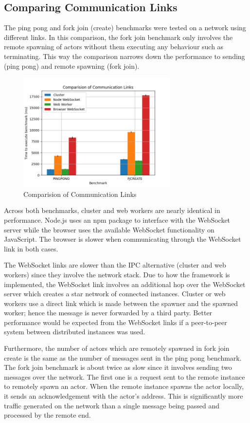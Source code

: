 \documentclass[12pt, a4paper]{report}
\theoremstyle{definition}
\theoremstyle{definition}%
\theoremstyle{definition}%
\theoremstyle{definition}%
\theoremstyle{definition}%
\theoremstyle{definition}%
\begin{document}
\subsection{Comparing Communication Links}
The ping pong and fork join (create) benchmarks were tested on a network using different links. In this comparison, the fork join benchmark only involves the remote spawning of actors without them executing any behaviour such as terminating. This way the comparison narrows down the performance to sending (ping pong) and remote spawning (fork join).
\begin{figure}[H]
    \begin{centering}
        \includegraphics[width=300px]{resources/link.png}
        \caption{Comparision of Communication Links}
    \end{centering}
\end{figure}
Across both benchmarks, cluster and web workers are nearly identical in performance. Node.js uses an npm package to interface with the WebSocket server while the browser uses the available WebSocket functionality on JavaScript. The browser is slower when communicating through the WebSocket link in both cases. 

The WebSocket links are slower than the IPC alternative (cluster and web workers) since they involve the network stack. Due to how the framework is implemented, the WebSocket link involves an additional hop over the WebSocket server which creates a star network of connected instances. Cluster or web workers use a direct link which is made between the spawner and the spawned worker; hence the message is never forwarded by a third party. Better performance would be expected from the WebSocket links if a peer-to-peer system between distributed instances was used.

Furthermore, the number of actors which are remotely spawned in fork join create is the same as the number of messages sent in the ping pong benchmark. The fork join benchmark is about twice as slow since it involves sending two messages over the network. The first one is a request sent to the remote instance to remotely spawn an actor. When the remote instance spawns the actor locally, it sends an acknowledgement with the actor’s address. This is significantly more traffic generated on the network than a single message being passed and processed by the remote end.
\end{document}
